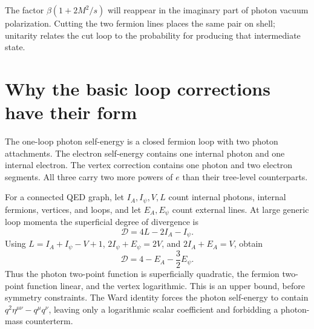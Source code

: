 \documentclass[11pt]{article}
\newcommand{\module}[1]{\clearpage\section{#1}}
\begin{document}
\begin{remarkbox}
The factor \(\beta(1+2M^2/s)\) will reappear in the imaginary part of
photon vacuum polarization. Cutting the two fermion lines places the
same pair on shell; unitarity relates the cut loop to the probability
for producing that intermediate state.
\end{remarkbox}

\module{Why the basic loop corrections have their form}
The one-loop photon self-energy is a closed fermion loop with two photon
attachments. The electron self-energy contains one internal photon and
one internal electron. The vertex correction contains one photon and two
electron segments. All three carry two more powers of \(e\) than their
tree-level counterparts.
\begin{center}
\end{center}

For a connected QED graph, let \(I_A,I_\psi,V,L\) count internal photons,
internal fermions, vertices, and loops, and let \(E_A,E_\psi\) count
external lines. At large generic loop momenta the superficial degree of
divergence is
\begin{equation}
 \mathcal D=4L-2I_A-I_\psi.
\end{equation}
Using \(L=I_A+I_\psi-V+1\),
\(2I_\psi+E_\psi=2V\), and \(2I_A+E_A=V\), obtain
\begin{equation}
 \mathcal D=4-E_A-\frac32E_\psi.
\end{equation}
Thus the photon two-point function is superficially quadratic, the
fermion two-point function linear, and the vertex logarithmic.
This is an upper bound, before symmetry constraints. The Ward identity
forces the photon self-energy to contain
\(q^2\eta^{\mu\nu}-q^\mu q^\nu\), leaving only a logarithmic scalar
coefficient and forbidding a photon-mass counterterm.
\end{document}
